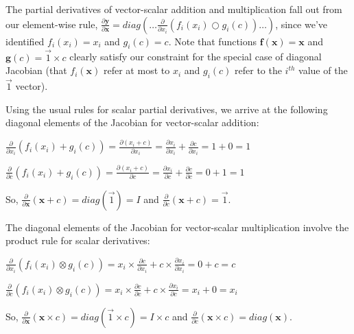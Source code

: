 \documentclass[11pt]{article}
\begin{document}
The partial derivatives of vector-scalar addition and multiplication fall out from our element-wise rule, $\frac{\partial \mathbf{y}}{\partial \mathbf{x}} = diag \left( \ldots \frac{\partial}{\partial x_i} ( f_i(x_i) \bigcirc g_i(c) ) \ldots \right)$, since we've identified $f_i(x_i) = x_i$ and $g_i(c) = c$. Note that functions $\mathbf{f(x)} = \mathbf{x}$ and $\mathbf{g}(c) = \vec{1} \times c$ clearly satisfy our constraint for the special case of diagonal Jacobian (that $f_i(\mathbf{x})$ refer at most to $x_i$ and $g_i(c)$ refer to the $i^{th}$ value of the $\vec{1}$ vector). 

Using the usual rules for scalar partial derivatives, we arrive at the following diagonal elements of the Jacobian for vector-scalar addition:
 
$\frac{\partial}{\partial x_i} ( f_i(x_i) + g_i(c) ) = \frac{\partial (x_i + c)}{\partial x_i} = \frac{\partial x_i}{\partial x_i} + \frac{\partial c}{\partial x_i} = 1 + 0 = 1$

$\frac{\partial}{\partial c} ( f_i(x_i) + g_i(c) ) = \frac{\partial (x_i + c)}{\partial c} = \frac{\partial x_i}{\partial c} + \frac{\partial c}{\partial c} = 0 + 1 = 1$

So, $\frac{\partial}{\partial \mathbf{x}} ( \mathbf{x} + c ) = diag(\vec{1}) = I$ and $\frac{\partial}{\partial c} ( \mathbf{x} + c ) = \vec{1}$.

The diagonal elements of the Jacobian for vector-scalar multiplication involve the product rule for scalar derivatives:

$\frac{\partial}{\partial x_i} ( f_i(x_i) \otimes g_i(c) ) = x_i \times \frac{\partial c}{\partial x_i} + c \times \frac{\partial x_i}{\partial x_i} = 0 + c = c$

$\frac{\partial}{\partial c} ( f_i(x_i) \otimes g_i(c) ) = x_i \times \frac{\partial c}{\partial c} + c \times \frac{\partial x_i}{\partial c} = x_i + 0 = x_i$

So, $\frac{\partial}{\partial \mathbf{x}} ( \mathbf{x} \times c ) = diag(\vec{1} \times c) = I \times c$ and $\frac{\partial}{\partial c} ( \mathbf{x} \times c ) = diag(\mathbf{x})$.
\end{document}
